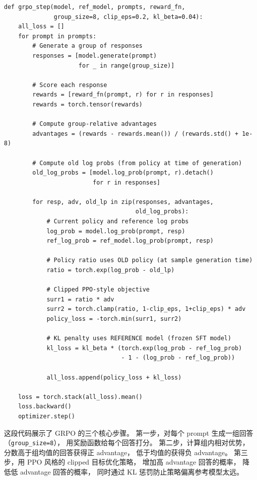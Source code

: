 \begin{lstlisting}[caption={GRPO training step (simplified)}]
def grpo_step(model, ref_model, prompts, reward_fn,
              group_size=8, clip_eps=0.2, kl_beta=0.04):
    all_loss = []
    for prompt in prompts:
        # Generate a group of responses
        responses = [model.generate(prompt)
                     for _ in range(group_size)]

        # Score each response
        rewards = [reward_fn(prompt, r) for r in responses]
        rewards = torch.tensor(rewards)

        # Compute group-relative advantages
        advantages = (rewards - rewards.mean()) / (rewards.std() + 1e-8)

        # Compute old log probs (from policy at time of generation)
        old_log_probs = [model.log_prob(prompt, r).detach()
                         for r in responses]

        for resp, adv, old_lp in zip(responses, advantages,
                                     old_log_probs):
            # Current policy and reference log probs
            log_prob = model.log_prob(prompt, resp)
            ref_log_prob = ref_model.log_prob(prompt, resp)

            # Policy ratio uses OLD policy (at sample generation time)
            ratio = torch.exp(log_prob - old_lp)

            # Clipped PPO-style objective
            surr1 = ratio * adv
            surr2 = torch.clamp(ratio, 1-clip_eps, 1+clip_eps) * adv
            policy_loss = -torch.min(surr1, surr2)

            # KL penalty uses REFERENCE model (frozen SFT model)
            kl_loss = kl_beta * (torch.exp(log_prob - ref_log_prob)
                                 - 1 - (log_prob - ref_log_prob))

            all_loss.append(policy_loss + kl_loss)

    loss = torch.stack(all_loss).mean()
    loss.backward()
    optimizer.step()
\end{lstlisting}

这段代码展示了 GRPO 的三个核心步骤。
第一步，对每个 prompt 生成一组回答（\texttt{group\_size=8}），
用奖励函数给每个回答打分。
第二步，计算组内相对优势，
分数高于组均值的回答获得正 advantage，
低于均值的获得负 advantage。
第三步，用 PPO 风格的 clipped 目标优化策略，
增加高 advantage 回答的概率，
降低低 advantage 回答的概率，
同时通过 KL 惩罚防止策略偏离参考模型太远。

